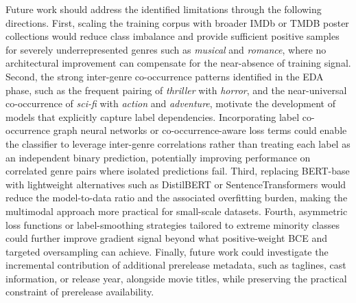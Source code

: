 \documentclass[conference]{IEEEtran}
\begin{document}
Future work should address the identified limitations through the 
following directions. First, scaling the training corpus with 
broader IMDb or TMDB poster collections would reduce class 
imbalance and provide sufficient positive samples for severely 
underrepresented genres such as \textit{musical} and 
\textit{romance}, where no architectural improvement can 
compensate for the near-absence of training signal. Second, 
the strong inter-genre co-occurrence patterns identified in the 
EDA phase, such as the frequent pairing of \textit{thriller} 
with \textit{horror}, and the near-universal co-occurrence of 
\textit{sci-fi} with \textit{action} and \textit{adventure}, 
motivate the development of models that explicitly capture label 
dependencies. Incorporating label co-occurrence graph neural 
networks or co-occurrence-aware loss terms could enable the 
classifier to leverage inter-genre correlations rather than 
treating each label as an independent binary prediction, 
potentially improving performance on correlated genre pairs 
where isolated predictions fail. Third, replacing BERT-base 
with lightweight alternatives such as DistilBERT or 
SentenceTransformers would reduce the model-to-data ratio and 
the associated overfitting burden, making the multimodal 
approach more practical for small-scale datasets. Fourth, 
asymmetric loss functions or label-smoothing strategies tailored 
to extreme minority classes could further improve gradient 
signal beyond what positive-weight BCE and targeted oversampling 
can achieve. Finally, future work could investigate the 
incremental contribution of additional prerelease metadata, 
such as taglines, cast information, or release year, 
alongside movie titles, while preserving the practical 
constraint of prerelease availability.
\end{document}
